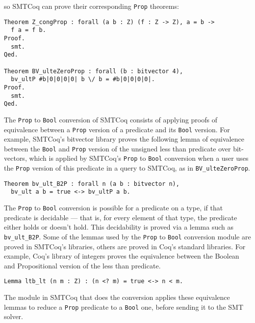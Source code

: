 \documentclass{article}
\begin{document}
	so SMTCoq can prove their 
	corresponding \texttt{Prop}
	theorems:
	\begin{verbatim}
Theorem Z_congProp : forall (a b : Z) (f : Z -> Z), a = b -> 
  f a = f b.
Proof.
  smt.
Qed.
	
Theorem BV_ulteZeroProp : forall (b : bitvector 4), 
  bv_ultP #b|0|0|0|0| b \/ b = #b|0|0|0|0|.
Proof.
  smt.
Qed.
	\end{verbatim}
	The	\texttt{Prop} to \texttt{Bool} 
	conversion of SMTCoq consists of 
	applying proofs of equivalence 
	between a \texttt{Prop} version
	of a predicate and its \texttt{Bool}
	version. For example, SMTCoq's 
	bitvector library proves the 
	following lemma of equivalence 
	between the \texttt{Bool}
	and \texttt{Prop} version of the 
	unsigned less than predicate over
	bit-vectors, which is applied 
	by SMTCoq's \texttt{Prop} to 
	\texttt{Bool} conversion when 
	a user uses the \texttt{Prop}
	version of this predicate in a 
	query to SMTCoq, as in 
	\texttt{BV\_ulteZeroProp}.
	\begin{verbatim}
Theorem bv_ult_B2P : forall n (a b : bitvector n), 
  bv_ult a b = true <-> bv_ultP a b.
	\end{verbatim}
	The \texttt{Prop} to \texttt{Bool}
	conversion is possible for a predicate 
	on a type, if that predicate is 
	decidable --- that is, for every 
	element of that type, the predicate 
	either holds or doesn't hold. This 
	decidability is proved via a lemma 
	such as \texttt{bv\_ult\_B2P}. Some
	of the lemmas used by the 
	\texttt{Prop} to \texttt{Bool} 
	conversion module are proved in SMTCoq's
	libraries, others are proved in 
	Coq's standard libraries. For 
	example, Coq's library of integers
	proves the equivalence between the 
	Boolean and Propositional version 
	of the less than predicate.
	\begin{verbatim}
Lemma ltb_lt (n m : Z) : (n <? m) = true <-> n < m.
	\end{verbatim}
	The module in SMTCoq that does
	the conversion applies these 
	equivalence lemmas to reduce a 
	\texttt{Prop} predicate to a 
	\texttt{Bool} one, before sending 
	it to the SMT solver.	
	
	


\end{document}
